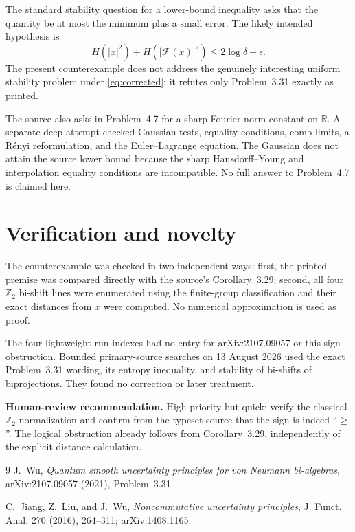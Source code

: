 \documentclass[11pt]{article}
\newcommand{\F}{\mathcal F}
\begin{document}
The standard stability question for a lower-bound inequality asks that the
quantity be at most the minimum plus a small error.  The likely intended
hypothesis is
\begin{equation}\label{eq:corrected}
 H(|x|^2)+H(|\F(x)|^2)\le 2\log\delta+\epsilon.
\end{equation}
The present counterexample does not address the genuinely interesting
uniform stability problem under \eqref{eq:corrected}; it refutes only
Problem~3.31 exactly as printed.

The source also asks in Problem~4.7 for a sharp Fourier-norm constant on
$\mathbb R$.  A separate deep attempt checked Gaussian tests, equality
conditions, comb limits, a R\'enyi reformulation, and the Euler--Lagrange
equation.  The Gaussian does not attain the source lower bound because the
sharp Hausdorff--Young and interpolation equality conditions are
incompatible.  No full answer to Problem~4.7 is claimed here.

\section{Verification and novelty}

The counterexample was checked in two independent ways: first, the printed
premise was compared directly with the source's Corollary~3.29; second, all
four $\mathbb Z_2$ bi-shift lines were enumerated using the finite-group
classification and their exact distances from $x$ were computed.  No
numerical approximation is used as proof.

The four lightweight run indexes had no entry for arXiv:2107.09057 or this
sign obstruction.  Bounded primary-source searches on 13 August 2026 used
the exact Problem~3.31 wording, its entropy inequality, and stability of
bi-shifts of biprojections.  They found no correction or later treatment.

\medskip
\noindent\textbf{Human-review recommendation.}
High priority but quick: verify the classical $\mathbb Z_2$ normalization and
confirm from the typeset source that the sign is indeed ``$\ge$''.  The
logical obstruction already follows from Corollary~3.29, independently of
the explicit distance calculation.

\begin{thebibliography}{9}
J.~Wu, \emph{Quantum smooth uncertainty principles for von Neumann
bi-algebras}, arXiv:2107.09057 (2021), Problem~3.31.

C.~Jiang, Z.~Liu, and J.~Wu,
\emph{Noncommutative uncertainty principles},
J. Funct. Anal. 270 (2016), 264--311; arXiv:1408.1165.
\end{thebibliography}
\end{document}
